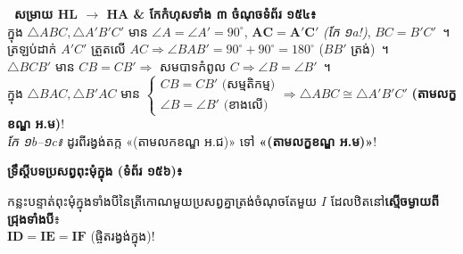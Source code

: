 \documentclass[a4paper,10pt]{article}
\newcommand{\en}[1]{{\TimesEn #1}}
\newcommand{\tri}[1]{\ensuremath{\triangle #1}}
\newcommand{\ang}[1]{\ensuremath{\angle #1}}
\newcommand{\cg}{\ensuremath{\cong}}
\begin{document}
\begin{tcolorbox}[
  enhanced, sharp corners, colback=white, colframe=black,
  boxrule=1.5pt, borderline={0.6pt}{2.2pt}{black},
  boxsep=1pt, top=4pt, bottom=4pt, left=6pt, right=6pt
]
  \noindent
  \begin{minipage}[t]{9.25cm}
    \begin{tcolorbox}[enhanced, sharp corners, colback=white, colframe=black, boxrule=0.95pt, boxsep=1pt, equal height group=posterMidHL, top=3pt, bottom=3pt, left=5pt, right=5pt]
      \raggedright\fontsize{7.45pt}{10.7pt}\selectfont
      \textbf{\ សម្រាយ \en{HL $\to$ HA} \& កែកំហុសទាំង ៣ ចំណុចទំព័រ ១៥៤៖}\\
      ក្នុង $\tri{ABC}, \tri{A'B'C'}$ មាន $\ang{A}=\ang{A'}=90^\circ$, $\mathbf{AC=A'C'}$ \textit{(កែ ១a!)}, $BC=B'C'$~។\\
      ត្រឡប់ដាក់ $A'C'$ ត្រួតលើ $AC \Rightarrow \ang{BAB'}=90^\circ+90^\circ=180^\circ$ ($BB'$ ត្រង់)~។\\
      $\tri{BCB'}$ មាន $CB=CB' \Rightarrow$ សមបាទកំពូល $C \Rightarrow \ang{B}=\ang{B'}$~។\\
      ក្នុង $\tri{BAC}, \tri{B'AC}$ មាន $\begin{cases}CB = CB' \text{ (សម្មតិកម្ម)}\\ \ang{B} = \ang{B'} \text{ (ខាងលើ)}\end{cases} \Rightarrow \tri{ABC}\cg\tri{A'B'C'}$ \textbf{(តាមលក្ខខណ្ឌ អ.ម)}!\\
      {\fontsize{7.0pt}{9.6pt}\selectfont\textit{កែ ១b--១c៖} ដូរពីរង្វង់តក្ក «\en{(}តាមលកខណ្ឌ អ\en{.}ជ\en{)}» ទៅ \textbf{«\en{(}តាមលក្ខខណ្ឌ អ\en{.}ម\en{)}»}!}
    \end{tcolorbox}
  \end{minipage}\hfill
  \begin{minipage}[t]{8.55cm}
    \begin{tcolorbox}[enhanced, sharp corners, colback=panelgray, colframe=black, boxrule=0.95pt, boxsep=1pt, equal height group=posterMidHL, top=3pt, bottom=3pt, left=5pt, right=5pt]
      \raggedright\fontsize{7.45pt}{10.7pt}\selectfont
      \textbf{ទ្រឹស្ដីបទប្រសព្វពុះមុំក្នុង (ទំព័រ ១៥៦)៖}\\[2pt]
      \begin{minipage}[c]{4.05cm}
        \raggedright\fontsize{7.25pt}{10.3pt}\selectfont
        កន្លះបន្ទាត់ពុះមុំក្នុងទាំងបីនៃត្រីកោណមួយប្រសព្វគ្នាត្រង់ចំណុចតែមួយ $I$ ដែលឋិតនៅ\textbf{ស្មើចម្ងាយពីជ្រុងទាំងបី}៖\\
        $\mathbf{ID = IE = IF}$ (ផ្ចិតរង្វង់ក្នុង)!
      \end{minipage}\hfill
      \begin{minipage}[c]{3.95cm}
        \centering

\end{minipage}
\end{tcolorbox}
\end{minipage}
\end{tcolorbox}
\end{document}
